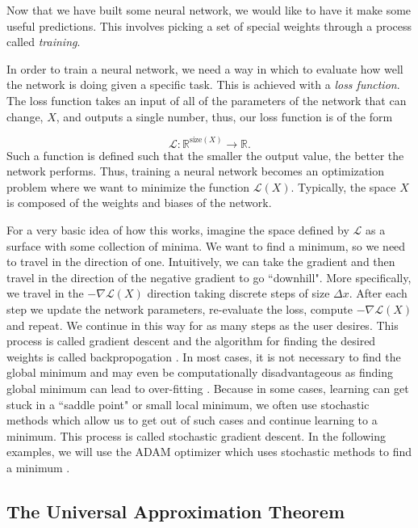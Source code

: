 \documentclass{CUP-JNL-DTM}%
\theoremstyle{definition}
\numberwithin{equation}{section}
\newcommand{\loss}{\mathcal{L}}
\newcommand{\Define}{\emph}
\begin{document}
Now that we have built some neural network, we would like to have it make some useful predictions. This involves picking a set of special weights through a process called \Define{training}. 

In order to train a neural network, we need a way in which to evaluate how well the network is doing given a specific task. This is achieved with a \emph{loss function}. The loss function takes an input of all of the parameters of the network that can change, $X$, and outputs a single number, thus, our loss function is of the form

\begin{equation}
    \loss : \mathbb{R}^{\textrm{size}(X)} \rightarrow \mathbb{R}. 
\end{equation}
Such a function is defined such that the smaller the output value, the better the network performs. Thus, training a neural network becomes an optimization problem where we want to minimize the function $\loss(X)$. Typically, the space $X$ is composed of the weights and biases of the network. 

For a very basic idea of how this works, imagine the space defined by $\loss$ as a surface with some collection of minima. We want to find a minimum, so we need to travel in the direction of one. Intuitively, we can take the gradient and then travel in the direction of the negative gradient to go ``downhill". More specifically, we travel in the $-\nabla \loss(X)$ direction taking discrete steps of size $\Delta x$. After each step we update the network parameters, re-evaluate the loss, compute $-\nabla \loss(X)$ and repeat. We continue in this way for as many steps as the user desires. This process is called gradient descent and the algorithm for finding the desired weights is called backpropogation \cite{chauvinBackpropagationTheoryArchitectures1995}. In most cases, it is not necessary to find the global minimum and may even be computationally disadvantageous as finding global minimum can lead to over-fitting \cite{choromanskaLossSurfacesMultilayer2015}. Because in some cases, learning can get stuck in a ``saddle point" or small local minimum, we often use stochastic methods which allow us to get out of such cases and continue learning to a minimum. This process is called stochastic gradient descent. In the following examples, we will use the ADAM optimizer which uses stochastic methods to find a minimum \cite{kingmaAdamMethodStochastic2017}. 


\subsection{The Universal Approximation Theorem}
\end{document}
